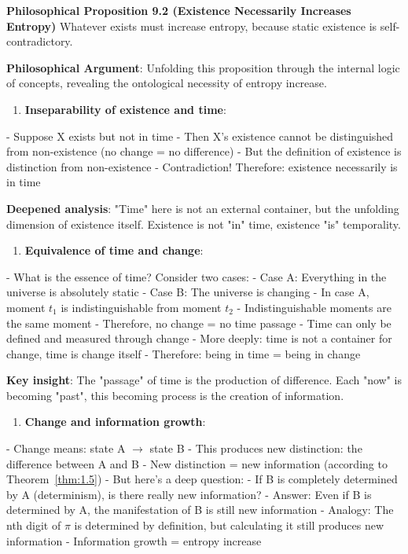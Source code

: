 \textbf{Philosophical Proposition 9.2 (Existence Necessarily Increases Entropy)}
Whatever exists must increase entropy, because static existence is self-contradictory.

\textbf{Philosophical Argument}:
Unfolding this proposition through the internal logic of concepts, revealing the ontological necessity of entropy increase.

\begin{enumerate}
\item \textbf{Inseparability of existence and time}:
\end{enumerate}
   - Suppose X exists but not in time
   - Then X's existence cannot be distinguished from non-existence (no change = no difference)
   - But the definition of existence is distinction from non-existence
   - Contradiction! Therefore: existence necessarily is in time
   
   \textbf{Deepened analysis}: "Time" here is not an external container,
   but the unfolding dimension of existence itself.
   Existence is not "in" time, existence "is" temporality.

\begin{enumerate}
\item \textbf{Equivalence of time and change}:
\end{enumerate}
   - What is the essence of time? Consider two cases:
   - Case A: Everything in the universe is absolutely static
   - Case B: The universe is changing
   - In case A, moment $t_1$ is indistinguishable from moment $t_2$
   - Indistinguishable moments are the same moment
   - Therefore, no change = no time passage
   - Time can only be defined and measured through change
   - More deeply: time is not a container for change, time is change itself
   - Therefore: being in time = being in change
   
   \textbf{Key insight}: The "passage" of time is the production of difference.
   Each "now" is becoming "past",
   this becoming process is the creation of information.

\begin{enumerate}
\item \textbf{Change and information growth}:
\end{enumerate}
   - Change means: state A $\rightarrow$ state B
   - This produces new distinction: the difference between A and B
   - New distinction = new information (according to Theorem~\ref{thm:1.5})
   - But here's a deep question:
     - If B is completely determined by A (determinism), is there really new information?
     - Answer: Even if B is determined by A, the manifestation of B is still new information
     - Analogy: The nth digit of $\pi$ is determined by definition, but calculating it still produces new information
   - Information growth = entropy increase
   
